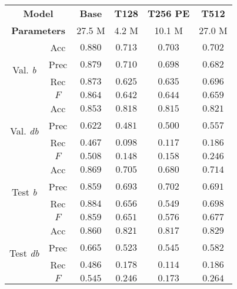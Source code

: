 \begin{tabular}{cc|cccc}
    \multicolumn{2}{c|}{\textbf{Model}} & \textbf{Base} & \textbf{T128} & \textbf{T256 PE} & \textbf{T512}\\
    \multicolumn{2}{c|}{\textbf{Parameters}} & 27.5 M & 4.2 M & 10.1 M & 27.0 M \\\hline
    \multirow{4}{*}{Val. \emph{b}}  & Acc  & $\mathbf{0.880}$ & $0.713$ & $0.703$ & $0.702$ \\
    & Prec & $\mathbf{0.879}$ & $0.710$ & $0.698$ & $0.682$ \\
    & Rec  & $\mathbf{0.873}$ & $0.625$ & $0.635$ & $0.696$ \\
    & $F$  & $\mathbf{0.864}$ & $0.642$ & $0.644$ & $0.659$ \\\hline
    \multirow{4}{*}{Val. \emph{db}} & Acc  & $\mathbf{0.853}$ & $0.818$ & $0.815$ & $0.821$ \\
    & Prec & $\mathbf{0.622}$ & $0.481$ & $0.500$ & $0.557$ \\
    & Rec  & $\mathbf{0.467}$ & $0.098$ & $0.117$ & $0.186$ \\
    & $F$  & $\mathbf{0.508}$ & $0.148$ & $0.158$ & $0.246$ \\\hline
    \multirow{4}{*}{Test \emph{b}}  & Acc  & $\mathbf{0.869}$ & $0.705$ & $0.680$ & $0.714$ \\
    & Prec & $\mathbf{0.859}$ & $0.693$ & $0.702$ & $0.691$ \\
    & Rec  & $\mathbf{0.884}$ & $0.656$ & $0.549$ & $0.698$ \\
    & $F$  & $\mathbf{0.859}$ & $0.651$ & $0.576$ & $0.677$ \\\hline
    \multirow{4}{*}{Test \emph{db}} & Acc  & $\mathbf{0.860}$ & $0.821$ & $0.817$ & $0.829$ \\
    & Prec & $\mathbf{0.665}$ & $0.523$ & $0.545$ & $0.582$ \\
    & Rec  & $\mathbf{0.486}$ & $0.178$ & $0.114$ & $0.186$ \\
    & $F$  & $\mathbf{0.545}$ & $0.246$ & $0.173$ & $0.264$ \\
\end{tabular}